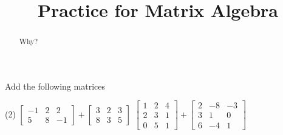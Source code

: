 \documentclass{ximera}
\title{Practice for Matrix Algebra}
\begin{document}
\begin{abstract}
Why?
\end{abstract}
\maketitle


\begin{exercise}
    Add the following matrices
    \begin{tasks}(2)
    \task
    $\begin{bmatrix}
        -1 & 2 & 2 \\
        5 & 8 & -1
    \end{bmatrix}
    +
    \begin{bmatrix}
        3 & 2 & 3 \\
        8 & 3 & 5
    \end{bmatrix}$
    \task
    $\begin{bmatrix}
        1 & 2 & 4 \\
        2 & 3 & 1 \\
        0 & 5 & 1
    \end{bmatrix}
    +
    \begin{bmatrix}
        2 & -8 & -3 \\
        3 & 1 & 0 \\
        6 & -4 & 1
    \end{bmatrix}$
    \end{tasks}
\end{exercise}
\end{document}

